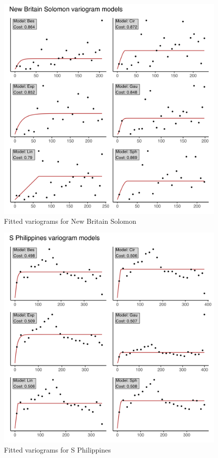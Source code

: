 \begin{figure}
\centering
\includegraphics{assets/figs/chpt3/NewBritainSolomonVgrms.png}
\caption[Fitted variograms for New Britain Solomon]{Fitted variograms for New Britain Solomon}
\end{figure}

\begin{figure}
\centering
\includegraphics{assets/figs/chpt3/SPhilippinesVgrms.png}
\caption[Fitted variograms for S Philippines]{Fitted variograms for S Philippines}
\end{figure}

